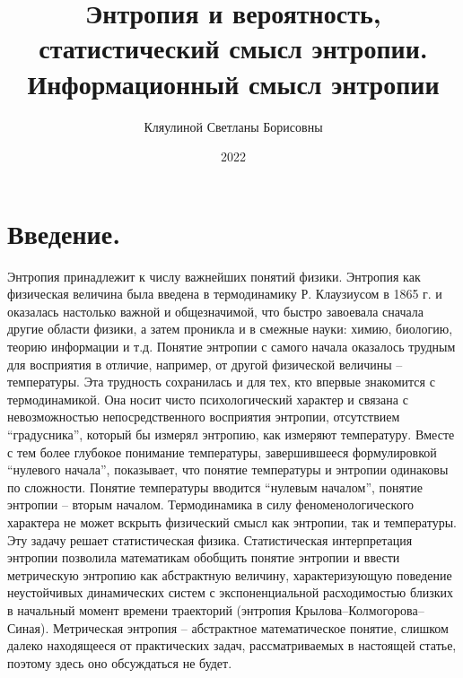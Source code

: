 \documentclass[bachelor, och, referat ]{SCWorks}
\begin{document}

\title{Энтропия и вероятность, статистический смысл энтропии. Информационный смысл энтропии}






\author{Кляулиной Светланы Борисовны}


\satitle{} %

\date{2022}

\maketitle

\section*{Введение.}
Энтропия принадлежит к числу важнейших понятий физики. Энтропия как физическая величина была введена в термодинамику Р. Клаузиусом в 1865 г. и оказалась настолько важной и общезначимой, что быстро завоевала сначала другие области физики, а затем проникла и в смежные науки: химию, биологию, теорию информации и т.д. Понятие энтропии с самого начала оказалось трудным для восприятия в отличие, например, от другой физической величины – температуры. Эта трудность сохранилась и для тех, кто впервые знакомится с термодинамикой. Она носит чисто психологический характер и связана с невозможностью непосредственного восприятия энтропии, отсутствием “градусника”, который бы измерял энтропию, как измеряют температуру. Вместе с тем более глубокое понимание температуры, завершившееся формулировкой “нулевого начала”, показывает, что понятие температуры и энтропии одинаковы по сложности. Понятие температуры вводится “нулевым началом”, понятие энтропии – вторым началом.
 Термодинамика в силу феноменологического характера не может вскрыть физический смысл как энтропии, так и температуры. Эту задачу решает статистическая физика. Статистическая интерпретация энтропии позволила математикам обобщить понятие энтропии и ввести метрическую энтропию как абстрактную величину, характеризующую поведение неустойчивых динамических систем с экспоненциальной расходимостью близких в начальный момент времени траекторий (энтропия Крылова–Колмогорова–Синая). Метрическая энтропия – абстрактное математическое понятие, слишком далеко находящееся от практических задач, рассматриваемых в настоящей статье, поэтому здесь оно обсуждаться не будет.
\end{document}
